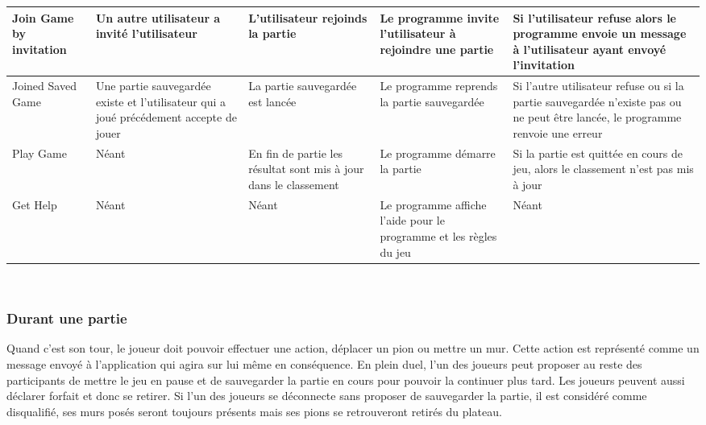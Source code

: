 \documentclass[french, utf8]{article}
\begin{document}
\newpage
\begin{center}
\begin{tabular}{|m{3cm}|m{3cm}|m{3cm}|m{3cm}|m{3cm}|}
\hline Join Game by invitation & Un autre utilisateur a invité l'utilisateur & L'utilisateur rejoinds la partie & Le programme invite l'utilisateur à rejoindre une partie & Si l'utilisateur refuse alors le programme envoie un message à l'utilisateur ayant envoyé l'invitation \\
\hline Joined Saved Game & Une partie sauvegardée existe et l'utilisateur qui a joué précédement accepte de jouer & La partie sauvegardée est lancée & Le programme reprends la partie sauvegardée  & Si l'autre utilisateur refuse ou si la partie sauvegardée n'existe pas ou ne peut être lancée, le programme renvoie une erreur \\
\hline Play Game & Néant & En fin de partie les résultat sont mis à jour dans le classement & Le programme démarre la partie & Si la partie est quittée en cours de jeu, alors le classement n'est pas mis à jour \\
\hline Get Help & Néant & Néant & Le programme affiche l'aide pour le programme et les règles du jeu & Néant \\
\hline
\end{tabular}\\
\end{center}
\subsubsection{Durant une partie}
Quand c'est son tour, le joueur doit pouvoir effectuer une action, déplacer un pion ou mettre un mur. Cette action est représenté comme un message envoyé à l'application qui agira sur lui même en conséquence.
En plein duel, l'un des joueurs peut proposer au reste des participants de mettre le jeu en pause et de sauvegarder la partie en cours pour pouvoir la continuer plus tard. Les joueurs peuvent aussi déclarer forfait et donc se retirer.
Si l'un des joueurs se déconnecte sans proposer de sauvegarder la partie, il est considéré comme disqualifié, ses murs posés seront toujours présents mais ses pions se retrouveront retirés du plateau. \newline
\end{document}
